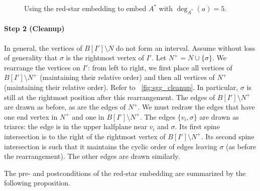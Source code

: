 \documentclass[11pt,a4paper,colorlinks=true,urlcolor=blue,citecolor=red]{article}
\theoremstyle{plain}
\newcommand{\subsubparagraph}[1]{\paragraph{#1}}
\begin{document}
\begin{figure}
  \centering\hfil {}\hfil {}\hfil {}\hfil \caption{Using the red-star embedding to embed $A^*$ with
    $\deg_{A^*}(a)=5$.}
  \label{fig:sgg}
\end{figure}


\subsubparagraph{Step 2 (Cleanup)} In general, the vertices of
$B[I']\setminus N$ do not form an interval. Assume without loss of
generality that $\sigma$ is the rightmost vertex of $I'$. Let
$N^+=N\cup\{\sigma\}$. We rearrange the vertices on $I'$: from left to
right, we first place all vertices of $B[I']\setminus N^+$ (maintaining
their relative order) and then all vertices of $N^+$ (maintaining their
relative order). Refer to \figurename~\ref{fig:sgg_cleanup}. In
particular, $\sigma$ is still at the rightmost position after this
rearrangement. The edges of $B[I']\setminus N^+$ are drawn as before, as
are the edges of $N^+$. We must redraw the edges that have one end
vertex in $N^+$ and one in $B[I']\setminus N^+$. The edges
$\{v_i,\sigma\}$ are drawn as triarcs: the edge is in the upper
halfplane near $v_i$ and $\sigma$. Its first spine intersection is to
the right of the rightmost vertex of $B[I']\setminus N^+$. Its second
spine intersection is such that it maintains the cyclic order of edges
leaving $\sigma$ (as before the rearrangement). The other edges are
drawn similarly.

The pre- and postconditions of the red-star embedding are
summarized by the following proposition.
\end{document}
